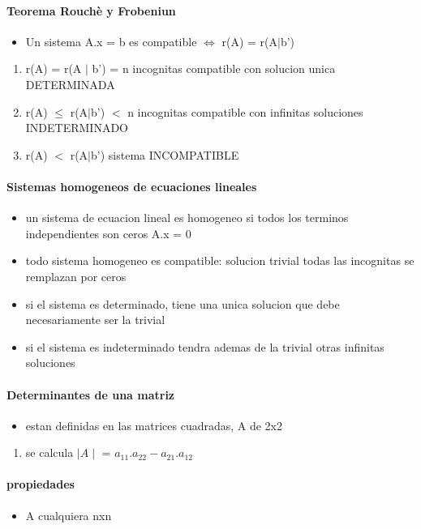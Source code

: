 \documentclass[a4paper]{article}
\begin{document}
\paragraph{Teorema Rouchè y Frobeniun}
\begin{itemize}
	\item Un sistema A.x = b es compatible $\Leftrightarrow$ r(A) = r(A$\mid$b')
\end{itemize}
\begin{enumerate}
	\item r(A) = r(A $\mid$ b') = n incognitas compatible con solucion unica DETERMINADA
	\item r(A) $\leqslant$ r(A$\mid$b') $<$ n incognitas compatible con infinitas soluciones INDETERMINADO
	\item r(A) $<$ r(A$\mid$b') sistema INCOMPATIBLE
\end{enumerate}

\paragraph{Sistemas homogeneos de ecuaciones lineales}
\begin{itemize}
	\item un sistema de ecuacion lineal es homogeneo si todos los terminos independientes son ceros A.x = 0
	\item todo sistema homogeneo es compatible: solucion trivial todas las incognitas se remplazan por ceros
	\item si el sistema es determinado, tiene una unica solucion que debe necesariamente ser la trivial
	\item si el sistema es indeterminado tendra ademas de la trivial otras infinitas soluciones
\end{itemize}

\paragraph{Determinantes de una matriz}
\begin{itemize}
	\item estan definidas en las matrices cuadradas, A de 2x2 
\end{itemize}
\begin{enumerate}
	\item se calcula $\mid A \mid$ = $a_{11}.a_{22} - a_{21}.a_{12}$
\end{enumerate}

\paragraph{propiedades}
\begin{itemize}
	\item A cualquiera nxn
\end{itemize}
\end{document}
